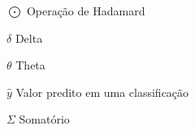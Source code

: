 \begin{simbolos}
  \item[$ \bigodot $] Operação de Hadamard
  \item[$ \delta $] Delta
  \item[$ \theta $] Theta
  \item[$ \hat{y} $] Valor predito em uma classificação
  \item[$ \Sigma $] Somatório
\end{simbolos}
